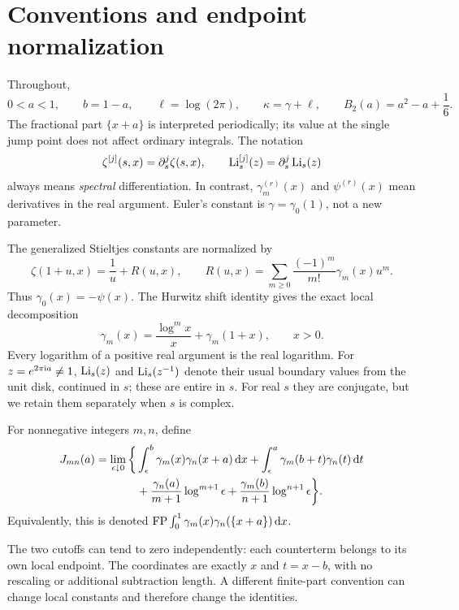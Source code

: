 \section{Conventions and endpoint normalization}\label{shj:conventions}
Throughout,
\[
0<a<1,\qquad b=1-a,\qquad \ell=\log(2\pi),\qquad
\kappa=\gamma+\ell,\qquad B_2(a)=a^2-a+\frac16.
\]
The fractional part $\{x+a\}$ is interpreted periodically; its value at the single jump point does not affect ordinary integrals. The notation
\[
\zeta^{[j]}(s,x)=\partial_s^j\zeta(s,x),\qquad
\operatorname{Li}_s^{[j]}(z)=\partial_s^j\operatorname{Li}_s(z)
\]
always means \emph{spectral} differentiation. In contrast, $\gamma_m^{(r)}(x)$ and $\psi^{(r)}(x)$ mean derivatives in the real argument. Euler's constant is $\gamma=\gamma_0(1)$, not a new parameter.

The generalized Stieltjes constants are normalized by
\begin{equation}\label{shj:laurent}
\zeta(1+u,x)=\frac1u+R(u,x),\qquad
R(u,x)=\sum_{m\ge0}\frac{(-1)^m}{m!}\gamma_m(x)u^m.
\end{equation}
Thus $\gamma_0(x)=-\psi(x)$. The Hurwitz shift identity gives the exact local decomposition
\begin{equation}\label{shj:localgamma}
\gamma_m(x)=\frac{\log^m x}{x}+\gamma_m(1+x),\qquad x>0.
\end{equation}
Every logarithm of a positive real argument is the real logarithm. For $z=e^{2\pi\mathrm{i} a}\ne1$, $\operatorname{Li}_s(z)$ and $\operatorname{Li}_s(z^{-1})$ denote their usual boundary values from the unit disk, continued in $s$; these are entire in $s$. For real $s$ they are conjugate, but we retain them separately when $s$ is complex.

\begin{definition}\label{shj:defJ}
For nonnegative integers $m,n$, define
\begin{align}
J_{mn}(a)=\lim_{\epsilon\downarrow0}\bigg\{&
\int_\epsilon^b\gamma_m(x)\gamma_n(x+a)\,\mathrm d x
+\int_\epsilon^a\gamma_m(b+t)\gamma_n(t)\,\mathrm d t\notag\\
&+\frac{\gamma_n(a)}{m+1}\log^{m+1}\epsilon
+\frac{\gamma_m(b)}{n+1}\log^{n+1}\epsilon\bigg\}.
\label{shj:Jcutoff}
\end{align}
Equivalently, this is denoted
$\operatorname{FP}\int_0^1\gamma_m(x)\gamma_n(\{x+a\})\,\mathrm d x$.
\end{definition}
The two cutoffs can tend to zero independently: each counterterm belongs to its own local endpoint. The coordinates are exactly $x$ and $t=x-b$, with no rescaling or additional subtraction length. A different finite-part convention can change local constants and therefore change the identities.


